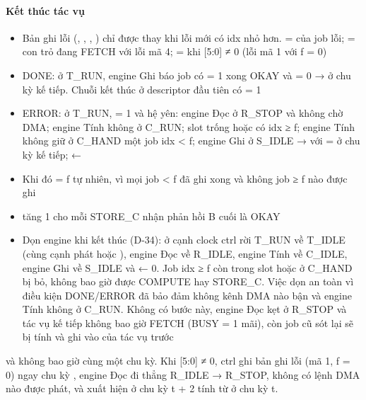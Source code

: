 \documentclass[10pt,a4paper]{article}
\begin{document}
\paragraph{Kết thúc tác vụ}\label{par:8-3}
\begin{itemize}
\item Bản ghi lỗi (, , , ) chỉ được thay khi lỗi mới có idx nhỏ hơn.  =  của job lỗi; = con trỏ đang FETCH với lỗi mã 4; =  khi [5:0] ≠ 0 (lỗi mã 1 với f = 0)
\item DONE: ở T\_RUN, engine Ghi báo job có  = 1 xong OKAY và  = 0 →  ở chu kỳ kế tiếp. Chuỗi kết thúc ở descriptor đầu tiên có  = 1
\item ERROR: ở T\_RUN,  = 1 và hệ yên: engine Đọc ở R\_STOP và không chờ DMA; engine Tính không ở C\_RUN; slot trống hoặc có idx ≥ f; engine Tính không giữ ở C\_HAND một job idx < f; engine Ghi ở S\_IDLE →  với  =  ở chu kỳ kế tiếp;  ← 
\item Khi đó  = f tự nhiên, vì mọi job < f đã ghi xong và không job ≥ f nào được ghi
\item {} tăng 1 cho mỗi STORE\_C nhận phản hồi B cuối là OKAY
\item Dọn engine khi kết thúc (D-34): ở cạnh clock ctrl rời T\_RUN về T\_IDLE (cùng cạnh phát  hoặc ), engine Đọc về R\_IDLE, engine Tính về C\_IDLE, engine Ghi về S\_IDLE và  ← 0. Job idx ≥ f còn trong slot hoặc ở C\_HAND bị bỏ, không bao giờ được COMPUTE hay STORE\_C. Việc dọn an toàn vì điều kiện DONE/ERROR đã bảo đảm không kênh DMA nào bận và engine Tính không ở C\_RUN. Không có bước này, engine Đọc kẹt ở R\_STOP và tác vụ kế tiếp không bao giờ FETCH (BUSY = 1 mãi), còn job cũ sót lại sẽ bị tính và ghi vào  của tác vụ trước
\end{itemize}

\begin{notebox}
 và  không bao giờ cùng một chu kỳ. Khi [5:0] ≠ 0, ctrl ghi bản ghi lỗi (mã 1, f = 0) ngay chu kỳ , engine Đọc đi thẳng R\_IDLE → R\_STOP, không có lệnh DMA nào được phát, và  xuất hiện ở chu kỳ t + 2 tính từ  ở chu kỳ t.
\end{notebox}
\end{document}
